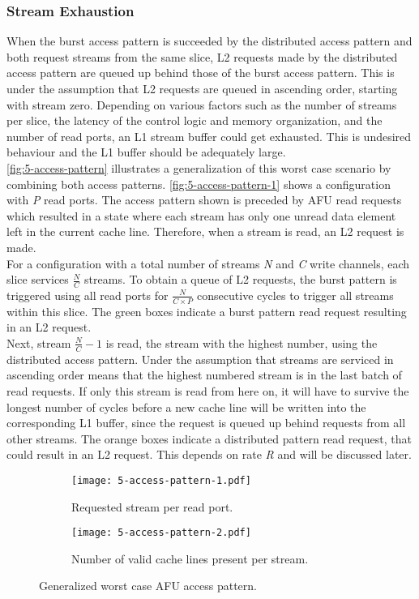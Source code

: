 \subsubsection{Stream Exhaustion}
When the burst access pattern is succeeded by the distributed access pattern and both request streams from the same slice, L2 requests made by the distributed access pattern are queued up behind those of the burst access pattern. This is under the assumption that L2 requests are queued in ascending order, starting with stream zero. Depending on various factors such as the number of streams per slice, the latency of the control logic and memory organization, and the number of read ports, an L1 stream buffer could get exhausted. This is undesired behaviour and the L1 buffer should be adequately large.\\
\autoref{fig:5-access-pattern} illustrates a generalization of this worst case scenario by combining both access patterns. \autoref{fig:5-access-pattern-1} shows a configuration with \textit{P} read ports. The access pattern shown is preceded by AFU read requests which resulted in a state where each stream has only one unread data element left in the current cache line. Therefore, when a stream is read, an L2 request is made.\\
For a configuration with a total number of streams \textit{N} and \textit{C} write channels, each slice services $\frac{N}{C}$ streams. To obtain a queue of L2 requests, the burst pattern is triggered using all read ports for $\frac{N}{C \times P}$ consecutive cycles to trigger all streams within this slice. The green boxes indicate a burst pattern read request resulting in an L2 request.\\
Next, stream $\frac{N}{C}-1$ is read, the stream with the highest number, using the distributed access pattern. Under the assumption that streams are serviced in ascending order means that the highest numbered stream is in the last batch of read requests. If only this stream is read from here on, it will have to survive the longest number of cycles before a new cache line will be written into the corresponding L1 buffer, since the request is queued up behind requests from all other streams. The orange boxes indicate a distributed pattern read request, that could result in an L2 request. This depends on rate \textit{R} and will be discussed later.

\begin{figure}[h]
  \centering
  \begin{subfigure}[c]{.35\textwidth}
    \centering
    \texttt{[image: 5-access-pattern-1.pdf]}
    \caption{Requested stream per read port.}
    \label{fig:5-access-pattern-1}
  \end{subfigure}%
  \begin{subfigure}[c]{.65\textwidth}
    \centering
    \texttt{[image: 5-access-pattern-2.pdf]}
    \caption{Number of valid cache lines present per stream.}
    \label{fig:5-access-pattern-2}
  \end{subfigure}
  \caption{Generalized worst case AFU access pattern.}
  \label{fig:5-access-pattern}
\end{figure}

